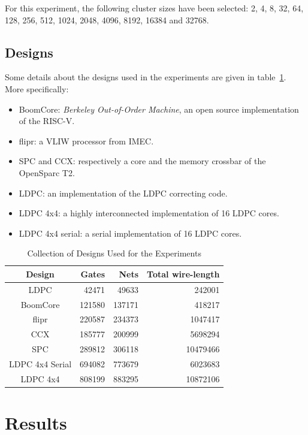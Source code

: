\documentclass[conference]{IEEEtran}
\begin{document}
For this experiment, the following cluster sizes have been selected: 2, 4, 8, 32, 64, 128, 256, 512, 1024, 2048, 4096, 8192, 16384 and 32768.

\subsection{Designs}
Some details about the designs used in the experiments are given in table~\ref{tab:designs}.
More specifically:
\begin{itemize}
    \item BoomCore: \textit{Berkeley Out-of-Order Machine}, an open source implementation of the RISC-V.
    \item flipr: a VLIW processor from IMEC.
    \item SPC and CCX: respectively a core and the memory crossbar of the OpenSparc T2.
    \item LDPC: an implementation of the LDPC correcting code.
    \item LDPC 4x4: a highly interconnected implementation of 16 LDPC cores.
    \item LDPC 4x4 serial: a serial implementation of 16 LDPC cores.
\end{itemize}


\begin{table}[!t]
\renewcommand{\arraystretch}{1.3}
\caption{Collection of Designs Used for the Experiments}
\label{tab:designs}
\centering
\begin{tabular}{||c|r|r|r||}
\hline
Design & Gates & Nets & Total wire-length\\
\hline
\hline
LDPC & 42471 & 49633 & 242001\\
\hline
BoomCore & 121580 & 137171 & 418217\\
\hline
flipr & 220587 & 234373 & 1047417 \\
\hline
CCX & 185777 & 200999 & 5698294\\
\hline
SPC & 289812 & 306118 & 10479466\\
\hline
LDPC 4x4 Serial & 694082 & 773679 & 6023683\\
\hline
LDPC 4x4 & 808199 & 883295 & 10872106\\
\hline
\end{tabular}
\end{table}


\section{Results}\label{sec:res}
\end{document}
